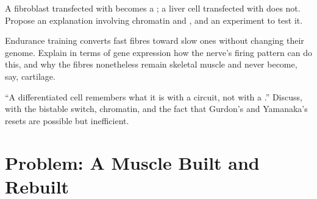 \begin{exercise}[$\star\star\star$]\label{exo:b2:cell-differentiation:10}
A fibroblast transfected with  becomes a ; a liver cell
transfected with  does not. Propose an explanation involving
chromatin and , and an experiment to test it.
\end{exercise}

\begin{exercise}[$\star\star\star$]\label{exo:b2:cell-differentiation:11}
Endurance training converts fast fibres toward slow ones without
changing their genome. Explain in terms of gene expression how the
nerve's firing pattern can do this, and why the fibres nonetheless
remain skeletal muscle and never become, say, cartilage.
\end{exercise}

\begin{exercise}[$\star\star\star$]\label{exo:b2:cell-differentiation:12}
``A differentiated cell remembers what it is with a circuit, not
with a .'' Discuss, with the bistable switch, chromatin, and
the fact that Gurdon's and Yamanaka's resets are possible but
inefficient.
\end{exercise}

\section{Problem: A Muscle Built and Rebuilt}

